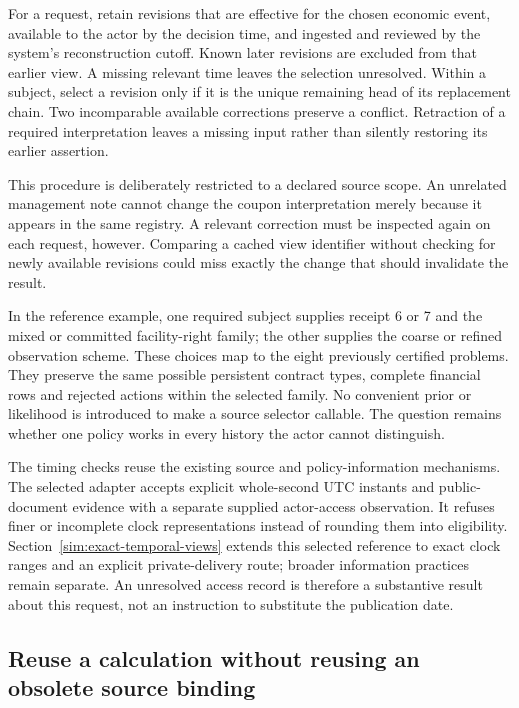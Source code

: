 For a request, retain revisions that are effective for the chosen economic event, available to the actor by the decision time, and ingested and reviewed by the system's reconstruction cutoff. Known later revisions are excluded from that earlier view. A missing relevant time leaves the selection unresolved. Within a subject, select a revision only if it is the unique remaining head of its replacement chain. Two incomparable available corrections preserve a conflict. Retraction of a required interpretation leaves a missing input rather than silently restoring its earlier assertion.

This procedure is deliberately restricted to a declared source scope. An unrelated management note cannot change the coupon interpretation merely because it appears in the same registry. A relevant correction must be inspected again on each request, however. Comparing a cached view identifier without checking for newly available revisions could miss exactly the change that should invalidate the result.

In the reference example, one required subject supplies receipt 6 or 7 and the mixed or committed facility-right family; the other supplies the coarse or refined observation scheme. These choices map to the eight previously certified problems. They preserve the same possible persistent contract types, complete financial rows and rejected actions within the selected family. No convenient prior or likelihood is introduced to make a source selector callable. The question remains whether one policy works in every history the actor cannot distinguish.

The timing checks reuse the existing source and policy-information mechanisms. The selected adapter accepts explicit whole-second UTC instants and public-document evidence with a separate supplied actor-access observation. It refuses finer or incomplete clock representations instead of rounding them into eligibility. Section~\ref{sim:exact-temporal-views} extends this selected reference to exact clock ranges and an explicit private-delivery route; broader information practices remain separate. An unresolved access record is therefore a substantive result about this request, not an instruction to substitute the publication date.

\subsection{Reuse a calculation without reusing an obsolete source binding}

